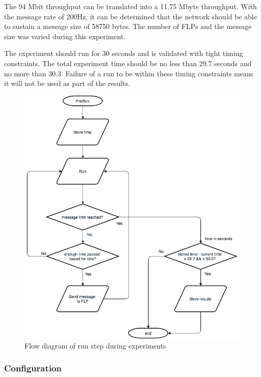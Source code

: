 \documentclass[]{article}
\begin{document}
The 94 Mbit throughput can be translated into a 11.75 Mbyte throughput. With the message rate of 200Hz, it can be determined that the network should be able to sustain a message size of 58750 bytes. The number of FLPs and the message size was varied during this experiment.

The experiment should run for 30 seconds and is validated with tight timing constraints. The total experiment time should be no less than 29.7 seconds and no more than 30.3. Failure of a run to be within these timing constraints means it will not be used as part of the results.

\begin{center}
	\begin{figure}[H]
		\includegraphics[width=\textwidth]{images/Results-gathering-flow-diagram.png}
		\caption{Flow diagram of run step during experiments}
		\label{fig:FlowDiagram}
	\end{figure}
\end{center}

\subsubsection{Configuration}
\end{document}
